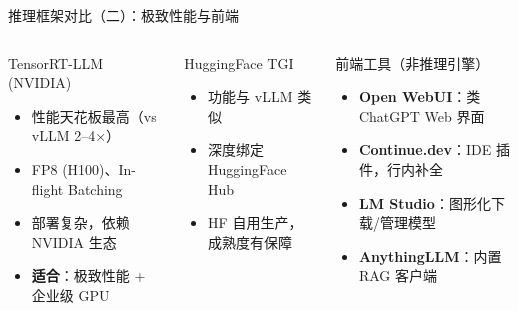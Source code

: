 \documentclass[UTF8,11pt,aspectratio=169]{beamer}
\begin{document}
\begin{frame}{推理框架对比（二）：极致性能与前端}
  \begin{columns}[T]
    \begin{block}{TensorRT-LLM (NVIDIA)}
      \begin{itemize}
        \item 性能天花板最高（vs vLLM 2--4$\times$）
        \item FP8 (H100)、In-flight Batching
        \item 部署复杂，依赖 NVIDIA 生态
        \item \textbf{适合}：极致性能 + 企业级 GPU
      \end{itemize}
    \end{block}

    \begin{block}{HuggingFace TGI}
      \begin{itemize}
        \item 功能与 vLLM 类似
        \item 深度绑定 HuggingFace Hub
        \item HF 自用生产，成熟度有保障
      \end{itemize}
    \end{block}

    \begin{block}{前端工具（非推理引擎）}
      \begin{itemize}
        \item \textbf{Open WebUI}：类 ChatGPT Web 界面
        \item \textbf{Continue.dev}：IDE 插件，行内补全
        \item \textbf{LM Studio}：图形化下载/管理模型
        \item \textbf{AnythingLLM}：内置 RAG 客户端
      \end{itemize}
    \end{block}
  \end{columns}
\end{frame}
\end{document}
